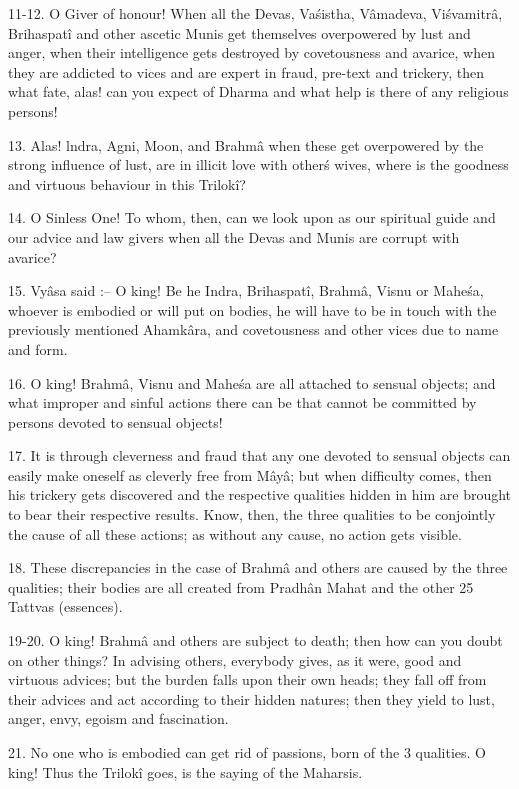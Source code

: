 11-12. O Giver of honour! When all the Devas, Va\'sistha, V\^amadeva, Vi\'svamitr\^a, Brihaspat\^i and other ascetic Munis get themselves overpowered by lust and anger, when their intelligence gets destroyed by covetousness and avarice, when they are addicted to vices and are expert in fraud, pre-text and trickery, then what fate, alas! can you expect of Dharma and what help is there of any religious persons!

13. Alas! lndra, Agni, Moon, and Brahm\^a when these get overpowered by the strong influence of lust, are in illicit love with other\'s wives, where is the goodness and virtuous behaviour in this Trilok\^i?

14. O Sinless One! To whom, then, can we look upon as our spiritual guide and our advice and law givers when all the Devas and Munis are corrupt with avarice?

15. Vy\^asa said :-- O king! Be he Indra, Brihaspat\^i, Brahm\^a, Visnu or Mahe\'sa, whoever is embodied or will put on bodies, he will have to be in touch with the previously mentioned Ahamk\^ara, and covetousness and other vices due to name and form.

16. O king! Brahm\^a, Visnu and Mahe\'sa are all attached to sensual objects; and what improper and sinful actions there can be that cannot be committed by persons devoted to sensual objects!

17. It is through cleverness and fraud that any one devoted to sensual objects can easily make oneself as cleverly free from M\^ay\^a; but when difficulty comes, then his trickery gets discovered and the respective qualities hidden in him are brought to bear their respective results. Know, then, the three qualities to be conjointly the cause of all these actions; as without any cause, no action gets visible.

18. These discrepancies in the case of Brahm\^a and others are caused by the three qualities; their bodies are all created from Pradh\^an Mahat and the other 25 Tattvas (essences).

19-20. O king! Brahm\^a and others are subject to death; then how can you doubt on other things? In advising others, everybody gives, as it were, good and virtuous advices; but the burden falls upon their own heads; they fall off from their advices and act according to their hidden natures; then they yield to lust, anger, envy, egoism and fascination.

21. No one who is embodied can get rid of passions, born of the 3 qualities. O king! Thus the Trilok\^i goes, is the saying of the Maharsis.

